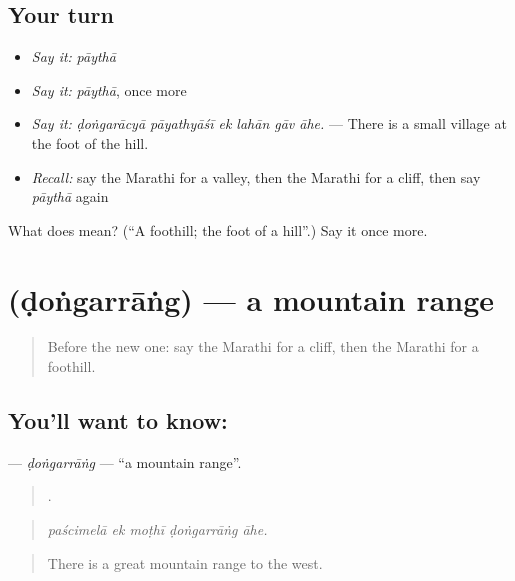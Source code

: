 \subsection*{Your turn}
\begin{itemize}
\raggedright
  \item \emph{Say it:} \emph{pāythā}
  \item \emph{Say it:} \emph{pāythā}, once more
  \item \emph{Say it:} \emph{ḍoṅgarācyā pāyathyāśī ek lahān gāv āhe.} — There is a small village at the foot of the hill.
  \item \emph{Recall:} say the Marathi for a valley, then the Marathi for a cliff, then say \emph{pāythā} again
\end{itemize}

\begin{tcolorbox}[breakable,colback=teal!4,colframe=teal!35!black,title={Before you move on}]
What does  mean? (\textquotedblleft{}A foothill; the foot of a hill\textquotedblright{}.) Say it once more.
\end{tcolorbox}
\section[\texorpdfstring{\mr{डोंगररांग} (ḍoṅgarrāṅg)}{डोंगररांग (ḍoṅgarrāṅg)}]{ (ḍoṅgarrāṅg) — a mountain range}

\label{lesson:MR-C442-dongarrang}



\begin{quote}
Before the new one: say the Marathi for a cliff, then the Marathi for a foothill.
\end{quote}

\subsection*{You'll want to know: }
\textbf{} — \emph{ḍoṅgarrāṅg} — \textquotedblleft{}a mountain range\textquotedblright{}.

\begin{quote}
    .
\end{quote}

\begin{quote}
\emph{paścimelā ek moṭhī ḍoṅgarrāṅg āhe.}
\end{quote}

\begin{quote}
There is a great mountain range to the west.
\end{quote}

